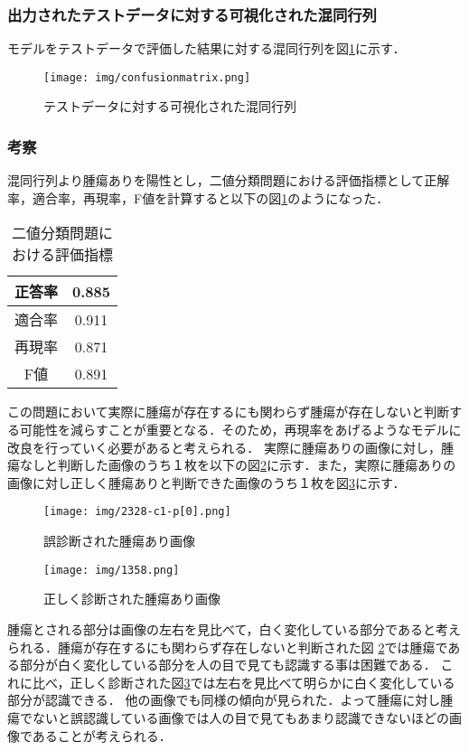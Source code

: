 \documentclass{article}
\begin{document}
\subsubsection{出力されたテストデータに対する可視化された混同行列}
モデルをテストデータで評価した結果に対する混同行列を図\ref{confusionmatrix}に示す．
\begin{figure}[H]
    \centering
    \texttt{[image: img/confusionmatrix.png]}
        \caption{テストデータに対する可視化された混同行列}
    \label{confusionmatrix}
    \end{figure}
\subsubsection{考察}
混同行列より腫瘍ありを陽性とし，二値分類問題における評価指標として正解率，適合率，再現率，F値を計算すると以下の図\ref{tab:eval}のようになった．
\begin{table}[htb]
    \begin{center}
        \caption{二値分類問題における評価指標}
        \begin{tabular}{|c|c|} \hline
            正答率&0.885\\  \hline
            適合率&0.911\\ \hline
            再現率&0.871\\ \hline
            F値&0.891\\ \hline
        \end{tabular}
        \label{tab:eval}
    \end{center}
\end{table}


この問題において実際に腫瘍が存在するにも関わらず腫瘍が存在しないと判断する可能性を減らすことが重要となる．そのため，再現率をあげるようなモデルに改良を行っていく必要があると考えられる．
実際に腫瘍ありの画像に対し，腫瘍なしと判断した画像のうち１枚を以下の図\ref{mistake}に示す．また，実際に腫瘍ありの画像に対し正しく腫瘍ありと判断できた画像のうち１枚を図\ref{correct}に示す．
\begin{figure}[H]
    \centering
    \texttt{[image: img/2328-c1-p[0].png]}
    \caption{誤診断された腫瘍あり画像}
    \label{mistake}
\end{figure}


\begin{figure}[H]
    \centering
    \texttt{[image: img/1358.png]}
    \caption{正しく診断された腫瘍あり画像}
    \label{correct}
\end{figure}
腫瘍とされる部分は画像の左右を見比べて，白く変化している部分であると考えられる．腫瘍が存在するにも関わらず存在しないと判断された図 \ref{mistake}では腫瘍である部分が白く変化している部分を人の目で見ても認識する事は困難である．
これに比べ，正しく診断された図\ref{correct}では左右を見比べて明らかに白く変化している部分が認識できる．
他の画像でも同様の傾向が見られた．よって腫瘍に対し腫瘍でないと誤認識している画像では人の目で見てもあまり認識できないほどの画像であることが考えられる．
\end{document}
